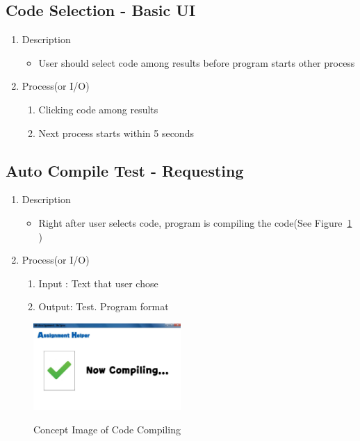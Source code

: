 \documentclass[conference]{IEEEtran}
\begin{document}
\begin{itemize}
\begin{itemize}
\begin{itemize}
\begin{itemize}
\subsection{Code Selection - Basic UI}

\begin{enumerate}
  \item Description
  \begin{itemize}
    \item User should select code among results before program starts other process
  \end{itemize}
  \item Process(or I/O)
  \begin{enumerate}
    \item Clicking code among results
    \item Next process starts within 5 seconds
  \end{enumerate}
\end{enumerate}


\textit{}

\subsection{Auto Compile Test - Requesting}

\begin{enumerate}
  \item Description
  \begin{itemize}
    \item Right after user selects code, program is compiling the code(See Figure~\ref{fig_concept_code_compile} )
  \end{itemize}
  \item Process(or I/O)
  \begin{enumerate}
    \item Input : Text that user chose
    \item Output: Test. Program format
  \end{enumerate}
\end{enumerate}

\textit{}
\begin{figure}[h]
\centering
\includegraphics[width=0.5\textwidth]{./figures/UI_code_validation.jpg}
\caption{Concept Image of Code Compiling}
\label{fig_concept_code_compile}
\textit{}


\end{figure}
\end{itemize}
\end{itemize}
\end{itemize}
\end{itemize}
\end{document}
